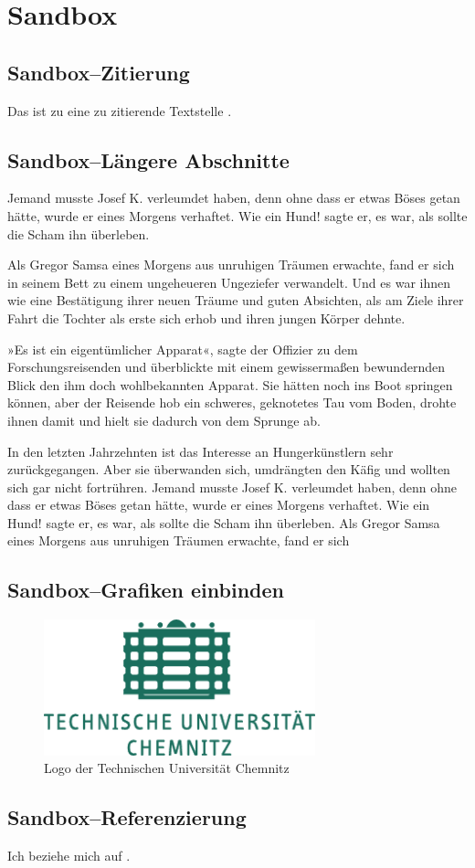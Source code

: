 \section{Sandbox}

\subsection{Sandbox--Zitierung}

Das ist zu eine zu zitierende Textstelle \cite{Klocke2008}.

\subsection{Sandbox--Längere Abschnitte}
Jemand musste Josef K. verleumdet haben, denn ohne dass er etwas Böses getan hätte, wurde er eines
Morgens verhaftet. Wie ein Hund! sagte er, es war, als sollte die Scham ihn überleben.

Als Gregor Samsa eines Morgens aus unruhigen Träumen erwachte, fand er sich in seinem Bett zu einem
ungeheueren Ungeziefer verwandelt. Und es war ihnen wie eine Bestätigung ihrer neuen Träume und
guten Absichten, als am Ziele ihrer Fahrt die Tochter als erste sich erhob und ihren jungen Körper
dehnte.

»Es ist ein eigentümlicher Apparat«, sagte der Offizier zu dem Forschungsreisenden und überblickte
mit einem gewissermaßen bewundernden Blick den ihm doch wohlbekannten Apparat. Sie hätten noch ins
Boot springen können, aber der Reisende hob ein schweres, geknotetes Tau vom Boden, drohte ihnen
damit und hielt sie dadurch von dem Sprunge ab.

In den letzten Jahrzehnten ist das Interesse an Hungerkünstlern sehr zurückgegangen. Aber sie
überwanden sich, umdrängten den Käfig und wollten sich gar nicht fortrühren. Jemand musste Josef K.
verleumdet haben, denn ohne dass er etwas Böses getan hätte, wurde er eines Morgens verhaftet. Wie
ein Hund! sagte er, es war, als sollte die Scham ihn überleben. Als Gregor Samsa eines Morgens aus
unruhigen Träumen erwachte, fand er sich



\subsection{Sandbox--Grafiken einbinden}

\begin{figure}[htbp] 
  \centering
     \includegraphics[width=0.7\textwidth]{img/logo_tuc.pdf}
  \caption{Logo der Technischen Universität Chemnitz}
  \label{fig:Bild1}
\end{figure}

\newpage

\newpage


\subsection{Sandbox--Referenzierung}

Ich beziehe mich auf .
